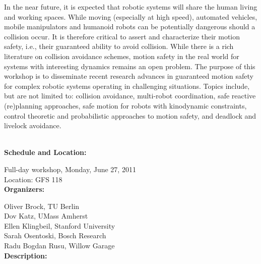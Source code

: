 {In the near future, it is expected that robotic systems will share the human living and working spaces. While moving (especially at high speed), automated vehicles, mobile manipulators and humanoid robots can be potentially dangerous should a collision occur. It is therefore critical to assert and characterize their motion safety, i.e., their guaranteed ability to avoid collision. While there is a rich literature on collision avoidance schemes, motion safety in the real world for systems with interesting dynamics remains an open problem. The purpose of this workshop is to disseminate recent research advances in guaranteed motion safety for complex robotic systems operating in challenging situations. Topics include, but are not limited to: collision avoidance, multi-robot coordination, safe reactive (re)planning approaches, safe motion for robots with kinodynamic constraints, control theoretic and probabilistic approaches to motion safety, and deadlock and livelock avoidance.


\\[5mm]

{\bf  Schedule and Location:}

Full-day workshop, Monday, June 27, 2011\\
Location: GFS 118 \\[4mm]

{\bf  Organizers:}

Oliver Brock, TU Berlin\\
Dov Katz, UMass Amherst\\
Ellen Klingbeil, Stanford University\\
Sarah Osentoski, Bosch Research\\
Radu Bogdan Rusu, Willow Garage\\[4mm]

{\bf Description: }

}
